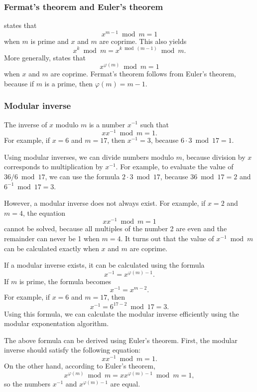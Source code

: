 \subsubsection{Fermat's theorem and Euler's theorem}


 states that
\[x^{m-1} \bmod m = 1\]
when $m$ is prime and $x$ and $m$ are coprime.
This also yields
\[x^k \bmod m = x^{k \bmod (m-1)} \bmod m.\]
More generally,  states that
\[x^{\varphi(m)} \bmod m = 1\]
when $x$ and $m$ are coprime.
Fermat's theorem follows from Euler's theorem,
because if $m$ is a prime, then $\varphi(m)=m-1$.

\subsubsection{Modular inverse}


The inverse of $x$ modulo $m$
is a number $x^{-1}$ such that
\[ x x^{-1} \bmod m = 1. \]
For example, if $x=6$ and $m=17$,
then $x^{-1}=3$, because $6\cdot3 \bmod 17=1$.

Using modular inverses, we can divide numbers
modulo $m$, because division by $x$
corresponds to multiplication by $x^{-1}$.
For example, to evaluate the value of $36/6 \bmod 17$,
we can use the formula $2 \cdot 3 \bmod 17$,
because $36 \bmod 17 = 2$ and $6^{-1} \bmod 17 = 3$.

However, a modular inverse does not always exist.
For example, if $x=2$ and $m=4$, the equation
\[ x x^{-1} \bmod m = 1 \]
cannot be solved, because all multiples of the number 2
are even and the remainder can never be 1 when $m=4$.
It turns out that the value of $x^{-1} \bmod m$
can be calculated exactly when $x$ and $m$ are coprime.

If a modular inverse exists, it can be
calculated using the formula
\[
x^{-1} = x^{\varphi(m)-1}.
\]
If $m$ is prime, the formula becomes
\[
x^{-1} = x^{m-2}.
\]
For example, if $x=6$ and $m=17$, then
\[x^{-1}=6^{17-2} \bmod 17 = 3.\]
Using this formula, we can calculate the modular inverse
efficiently using the modular exponentation algorithm.

The above formula can be derived using Euler's theorem.
First, the modular inverse should satisfy the following equation:
\[
x x^{-1} \bmod m = 1.
\]
On the other hand, according to Euler's theorem,
\[
x^{\varphi(m)} \bmod m =  xx^{\varphi(m)-1} \bmod m = 1,
\]
so the numbers $x^{-1}$ and $x^{\varphi(m)-1}$ are equal.

